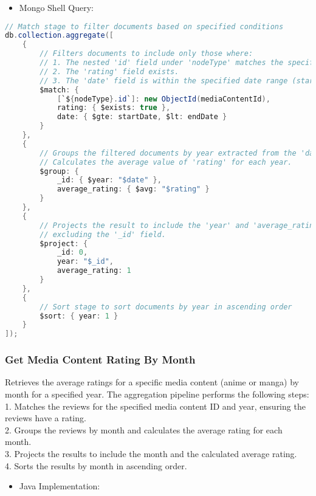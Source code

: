 \begin{itemize}
    \item Mongo Shell Query:
\end{itemize}

\begin{mdframed}[style=customstyle]
\begin{lstlisting}[language=java]
// Match stage to filter documents based on specified conditions
db.collection.aggregate([
    {
        // Filters documents to include only those where:
        // 1. The nested 'id' field under 'nodeType' matches the specified 'mediaContentId'.
        // 2. The 'rating' field exists.
        // 3. The 'date' field is within the specified date range (startDate to endDate).
        $match: {
            [`${nodeType}.id`]: new ObjectId(mediaContentId),
            rating: { $exists: true },
            date: { $gte: startDate, $lt: endDate }
        }
    },
    {
        // Groups the filtered documents by year extracted from the 'date' field.
        // Calculates the average value of 'rating' for each year.
        $group: {
            _id: { $year: "$date" },
            average_rating: { $avg: "$rating" }
        }
    },
    {
        // Projects the result to include the 'year' and 'average_rating' fields,
        // excluding the '_id' field.
        $project: {
            _id: 0,
            year: "$_id",
            average_rating: 1
        }
    },
    {
        // Sort stage to sort documents by year in ascending order
        $sort: { year: 1 }
    }
]);\end{lstlisting}
\end{mdframed}

\subsubsection*{Get Media Content Rating By Month}

Retrieves the average ratings for a specific media content (anime or manga) by month for a specified year.
The aggregation pipeline performs the following steps:\\
1. Matches the reviews for the specified media content ID and year, ensuring the reviews have a rating.\\
2. Groups the reviews by month and calculates the average rating for each month.\\
3. Projects the results to include the month and the calculated average rating.\\
4. Sorts the results by month in ascending order.
\begin{itemize}
    \item Java Implementation:
\end{itemize}

